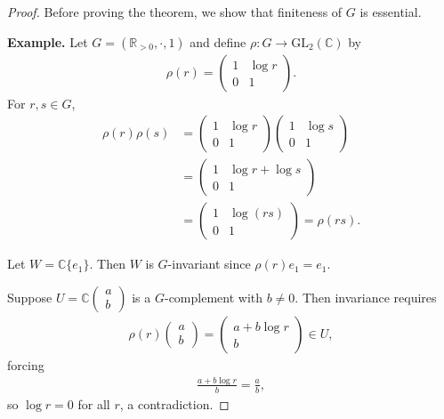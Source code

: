 \documentclass[titlepage]{article}
\theoremstyle{plain}
\theoremstyle{definition}
\theoremstyle{remark}
\theoremstyle{exercise-style}
\numberwithin{equation}{section}
\numberwithin{theorem}{section}
\numberwithin{remark}{section}
\begin{document}
\begin{proof}
    Before proving the theorem, we show that finiteness of $G$ is essential.
    
    \textbf{Example.} Let $G = (\mathbb{R}_{>0}, \cdot, 1)$ and define $\rho : G \to \mathrm{GL}_2(\mathbb{C})$ by
    \begin{align}
        \rho(r) =
        \begin{pmatrix}
        1 & \log r \\
        0 & 1
        \end{pmatrix}.
        \end{align}
        For $r,s \in G$,
        \begin{align}
        \rho(r)\rho(s)
        &=
        \begin{pmatrix}
        1 & \log r \\
        0 & 1
        \end{pmatrix}
        \begin{pmatrix}
        1 & \log s \\
        0 & 1
        \end{pmatrix} \\
        &=
        \begin{pmatrix}
        1 & \log r + \log s \\
        0 & 1
        \end{pmatrix} \\
        &=
        \begin{pmatrix}
        1 & \log(rs) \\
        0 & 1
        \end{pmatrix}
        = \rho(rs).
    \end{align}
    
    Let $W = \mathbb{C}\{e_1\}$. Then $W$ is $G$-invariant since $\rho(r)e_1 = e_1$.
    
    Suppose $U = \mathbb{C}\begin{pmatrix} a \\ b \end{pmatrix}$ is a $G$-complement with $b \neq 0$. Then invariance requires
    \begin{align}
        \rho(r)
        \begin{pmatrix}
        a \\ b
        \end{pmatrix}
        =
        \begin{pmatrix}
        a + b \log r \\
        b
        \end{pmatrix}
        \in U,
    \end{align}
    forcing
    \begin{align}
        \frac{a + b \log r}{b} = \frac{a}{b},
    \end{align}
    so $\log r = 0$ for all $r$, a contradiction.
    

\end{proof}
\end{document}
